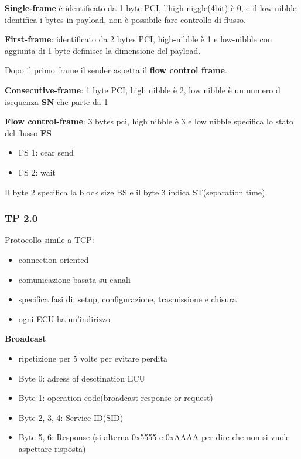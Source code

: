 \textbf{Single-frame} è identificato da 1 byte PCI, l'high-niggle(4bit) è 0, e il low-nibble identifica i bytes in payload, non è possibile fare controllo di flusso.

\textbf{First-frame}: identificato da 2 bytes PCI, high-nibble è 1 e low-nibble con aggiunta di 1 byte definisce la dimensione del payload.

Dopo il primo frame il sender aspetta il \textbf{flow control frame}.

\textbf{Consecutive-frame}: 1 byte PCI, high nibble è 2, low nibble è un numero d isequenza \textbf{SN} che parte da 1

\textbf{Flow control-frame}: 3 bytes pci, high nibble è 3 e low nibble specifica lo stato del flusso \textbf{FS}
\begin{itemize}
  \item FS 1: cear send
  \item FS 2: wait
\end{itemize}

Il byte 2 specifica la block size BS e il byte 3 indica ST(separation time).




\subsubsection{TP 2.0}
Protocollo simile a TCP:
\begin{itemize}
  \item connection oriented
  \item comunicazione basata su canali
  \item specifica fasi di: setup, configurazione, trasmissione e chisura
  \item ogni ECU ha un'indirizzo
\end{itemize}




\textbf{Broadcast}
\begin{itemize}
  \item ripetizione per 5 volte per evitare perdita
  \item Byte 0: adress of desctination ECU
  \item Byte 1: operation code(broadcast response or request)
  \item Byte 2, 3, 4: Service ID(SID) 
  \item Byte 5, 6: Response (si alterna 0x5555 e 0xAAAA per dire che non si vuole aspettare risposta)
\end{itemize}



